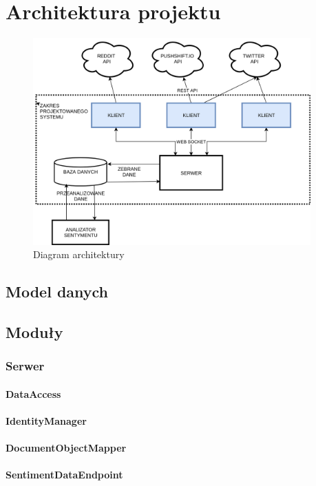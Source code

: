 \section{Architektura projektu}
\begin{figure}[h!]
  \centering
    \includegraphics[width=0.95\textwidth]{img/architecture.png}
  \caption{Diagram architektury}
  \label{fig:arch}
\end{figure}
\newpage
\subsection{Model danych}
\subsection{Moduły}
\subsubsection{Serwer}
\paragraph*{DataAccess}
\paragraph*{IdentityManager}
\paragraph*{DocumentObjectMapper}
\paragraph*{SentimentDataEndpoint}
